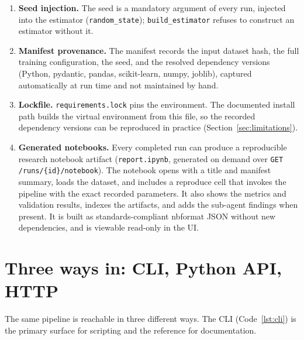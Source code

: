 \begin{enumerate}
	\item \textbf{Seed injection.} The seed is a mandatory argument of every run, injected into the estimator (\texttt{random\_state}); \texttt{build\_estimator} refuses to construct an estimator without it.
	\item \textbf{Manifest provenance.} The manifest records the input dataset hash, the full training configuration, the seed, and the resolved dependency versions (Python, pydantic, pandas, scikit-learn, numpy, joblib), captured automatically at run time and not maintained by hand.
	\item \textbf{Lockfile.} \texttt{requirements.lock} pins the environment. The documented install path builds the virtual environment from this file, so the recorded dependency versions can be reproduced in practice (Section~\ref{sec:limitations}).
	\item \textbf{Generated notebooks.} Every completed run can produce a reproducible research notebook artifact (\texttt{report.}\allowbreak{}\texttt{ipynb}, generated on demand over \texttt{GET /runs/}\allowbreak{}\texttt{\{id\}/}\allowbreak{}\texttt{notebook}). The notebook opens with a title and manifest summary, loads the dataset, and includes a reproduce cell that invokes the pipeline with the exact recorded parameters. It also shows the metrics and validation results, indexes the artifacts, and adds the sub-agent findings when present. It is built as standards-compliant nbformat JSON without new dependencies, and is viewable read-only in the UI.
\end{enumerate}

\section{Three ways in: CLI, Python API, HTTP}
\label{sec:surfaces}

The same pipeline is reachable in three different ways. The CLI (Code~\ref{lst:cli}) is the primary surface for scripting and the reference for documentation.

